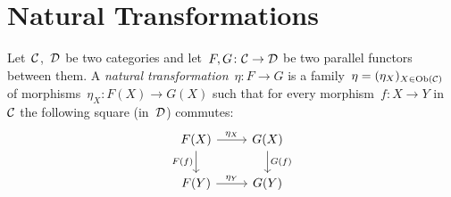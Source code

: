 \section{Natural Transformations}


\begin{definition}
  Let~$\mathcal{C}$,~$\mathcal{D}$ be two categories and let~$F, G \colon \mathcal{C} \to \mathcal{D}$ be two parallel functors between them.
  A \emph{natural transformation}~$\eta \colon F \to G$ is a family~$\eta = (\eta_X)_{X \in \operatorname{Ob}(\mathcal{C})}$ of morphisms~$\eta_X \colon F(X) \to G(X)$ such that for every morphism~$f \colon X \to Y$ in~$\mathcal{C}$ the following square (in~$\mathcal{D}$) commutes:
  \[
    \begin{tikzcd}
        F(X)
        \arrow{r}[above]{\eta_X}
        \arrow{d}[left]{F(f)}
      & G(X)
        \arrow{d}[right]{G(f)}
      \\
        F(Y)
        \arrow{r}[above]{\eta_Y}
      & G(Y)
    \end{tikzcd}
  \]
\end{definition}




